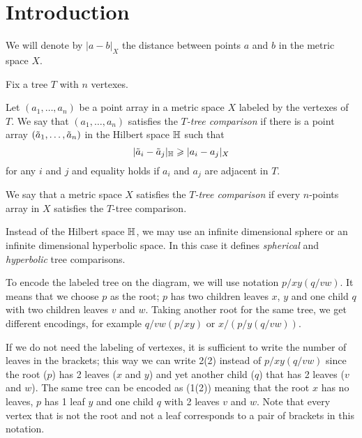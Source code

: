 \section{Introduction}\label{sec:intro}

We will denote by $|a-b|_X$ the distance between points $a$ and $b$ in the metric space $X$.

Fix a tree $T$ with $n$ vertexes.

Let $(a_1,\dots, a_n)$ be a point array in a metric space $X$ labeled by the vertexes of $T$.
We say that $(a_1,\dots, a_n)$  satisfies the \emph{$T$-tree comparison} if there is a point array $(\~a_1,\dots, \~a_n)$ in the Hilbert space $\HH$ such that 
\[|\~a_i-\~a_j|_\HH\ge|a_i-a_j|_X\]
for any $i$ and $j$ and equality holds if $a_i$ and $a_j$ are adjacent in $T$.

We say that a metric space $X$ satisfies the \emph{$T$-tree comparison} if 
every $n$-points array in $X$ satisfies the $T$-tree comparison.

Instead of the Hilbert space $\HH$, we may use an infinite dimensional sphere or an infinite dimensional hyperbolic space.
In this case it defines \emph{spherical} and \emph{hyperbolic} tree comparisons.

\begin{wrapfigure}{r}{27 mm}
\vskip-8mm
\end{wrapfigure}

To encode the labeled tree on the diagram, we will use notation $p/xy(q/vw)$.
It means that we choose $p$ as the root; 
$p$ has two children leaves $x$, $y$ and one child $q$ with two children leaves $v$ and $w$.
Taking another root for the same tree, we get different encodings, for example $q/vw(p/xy)$ or $x/(p/y(q/vw))$.

If we do not need the labeling of vertexes,
it is sufficient to write the number of leaves in the brackets;
this way we can write 2(2) instead of $p/xy(q/vw)$ since the root ($p$) has 2 leaves ($x$ and $y$) and yet another child ($q$) that has 2 leaves ($v$ and $w$).  
The same tree can be encoded as (1(2)) meaning that the root $x$ has no leaves, 
$p$ has 1 leaf $y$ and one child $q$ with 2 leaves $v$ and $w$.
Note that every vertex that is not the root and not a leaf corresponds to a pair of brackets in this notation.

